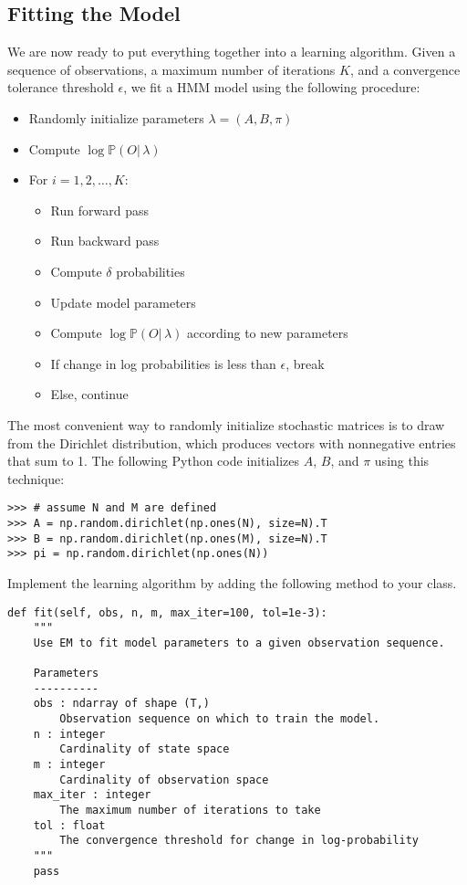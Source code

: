 \subsection*{Fitting the Model}
We are now ready to put everything together into a learning algorithm.
Given a sequence of observations, a maximum number of iterations $K$, and a convergence tolerance threshold $\epsilon$, we fit a HMM model using the following procedure:
\begin{itemize}
\item Randomly initialize parameters $\lambda = (A, B, \pi)$
\item Compute $\log \mathbb{P}(O |\, \lambda)$
\item For $i=1, 2, \ldots, K$:
\begin{itemize}
\item Run forward pass
\item Run backward pass
\item Compute $\delta$ probabilities
\item Update model parameters
\item Compute $\log \mathbb{P}(O |\, \lambda)$ according to new parameters
\item If change in log probabilities is less than $\epsilon$, break
\item Else, continue
\end{itemize}
\end{itemize}

The most convenient way to randomly initialize stochastic matrices is to draw from the Dirichlet distribution,
which produces vectors with nonnegative entries that sum to 1.
The following Python code initializes $A$, $B$, and $\pi$ using this technique:
\begin{lstlisting}
>>> # assume N and M are defined
>>> A = np.random.dirichlet(np.ones(N), size=N).T
>>> B = np.random.dirichlet(np.ones(M), size=N).T
>>> pi = np.random.dirichlet(np.ones(N))
\end{lstlisting}

\begin{problem}
Implement the learning algorithm by adding the following method to your class.
\begin{lstlisting}
def fit(self, obs, n, m, max_iter=100, tol=1e-3):
    """
    Use EM to fit model parameters to a given observation sequence.

    Parameters
    ----------
    obs : ndarray of shape (T,)
        Observation sequence on which to train the model.
    n : integer
        Cardinality of state space
    m : integer
        Cardinality of observation space
    max_iter : integer
        The maximum number of iterations to take
    tol : float
        The convergence threshold for change in log-probability
    """
    pass
\end{lstlisting}
\end{problem}

